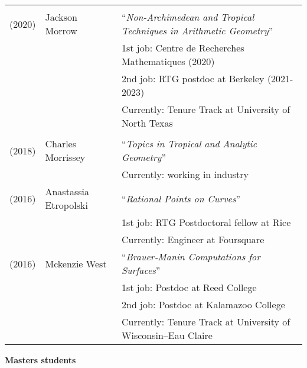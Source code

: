 \documentclass[margin,line]{res}
\newcommand{\defi}[1]{\textsf{#1}} 				%
\begin{document}
\begin{resume}
\begin{tabular}{lll}
    \vspace{4pt}\\ 
  (2020) & \defi{Jackson Morrow} &  ``\emph{Non-Archimedean and Tropical Techniques in Arithmetic Geometry}'' \\
         && \hspace{4 pt} 1st job: Centre de Recherches Mathematiques (2020)\\
         &&  \hspace{4 pt} 2nd job: RTG postdoc at Berkeley (2021-2023)\\
         && \hspace{4 pt} Currently: Tenure Track at University of North Texas\\ 
    \vspace{4pt}\\
  (2018) & \defi{Charles Morrissey} &   ``\emph{Topics in Tropical and Analytic Geometry}'' \\
         && \hspace{4 pt} Currently: working in industry
    \vspace{4pt}\\
  (2016) & \defi{Anastassia Etropolski} &   ``\emph{Rational Points on Curves}'' \\
         && \hspace{4 pt} 1st job: RTG Postdoctoral fellow at Rice \\
         && \hspace{4 pt} Currently: Engineer at Foursquare
    \vspace{4pt}\\
  (2016) & \defi{Mckenzie West} &   ``\emph{Brauer-Manin Computations for Surfaces}'' \\
         && \hspace{4 pt} 1st job: Postdoc at Reed College\\
         &&  \hspace{4 pt} 2nd job: Postdoc at Kalamazoo College \\
         && \hspace{4 pt} Currently: Tenure Track at University of Wisconsin--Eau Claire



\end{tabular}

{\bf Masters students}

\vspace*{-.15in}


\end{resume}
\end{document}
